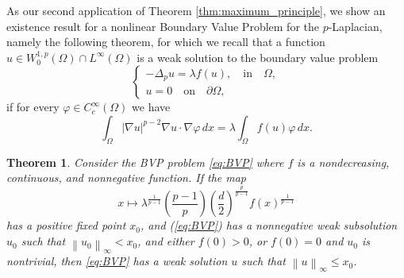 \documentclass[11pt]{amsart}
\newtheorem{theorem}{Theorem}[section]
\theoremstyle{definition}
\begin{document}
As our second application of Theorem \ref{thm:maximum_principle}, we show an existence result for a nonlinear Boundary Value Problem for the $p$-Laplacian,
namely the following theorem, for which we recall that a function 
    $u\in W^{1,p}_0\left(\Omega\right)\cap L^{\infty}\left(\Omega\right)$ is a weak solution to the boundary value problem 
    \begin{equation}
    \label{eq:BVP}
        \left\{
        \begin{array}{l}
        -\Delta_p u = \lambda f\left(u\right), \quad \mbox{in} \quad \Omega,\\
        u=0 \quad \mbox{on} \quad \partial \Omega,
        \end{array}
        \right.
    \end{equation}
    if for every $\varphi\in C_c^\infty(\Omega)$ we have
    \[
\int_{\Omega} \left|\nabla u\right|^{p-2}\nabla u\cdot\nabla \varphi \,dx= \lambda\int_{\Omega}f\left(u\right)\varphi\,dx.
\]
\begin{theorem}
\label{thm:existence}
    Consider the BVP problem \eqref{eq:BVP}
    where $f$ is a nondecreasing, continuous, and nonnegative function. 
    If the map 
    \begin{equation}
    \label{eq:fixed_point_map}
    x\mapsto \lambda^{\frac{1}{p-1}}\left(\frac{p-1}{p}\right)
\left(\frac{d}{2}\right)^{\frac{p}{p-1}}f\left(x\right)^{\frac{1}{p-1}}
     \end{equation}
    has a positive fixed point $x_0$, and (\ref{eq:BVP}) has a nonnegative weak subsolution $u_0$ such that
    $\left\|u_0\right\|_{\infty}<x_0$, and either $f(0)>0$, or $f(0)=0$ and $u_0$ is nontrivial, then \eqref{eq:BVP} has a weak solution $u$
    such that $\left\|u\right\|_{\infty}\leq x_0$.
\end{theorem}
\end{document}
